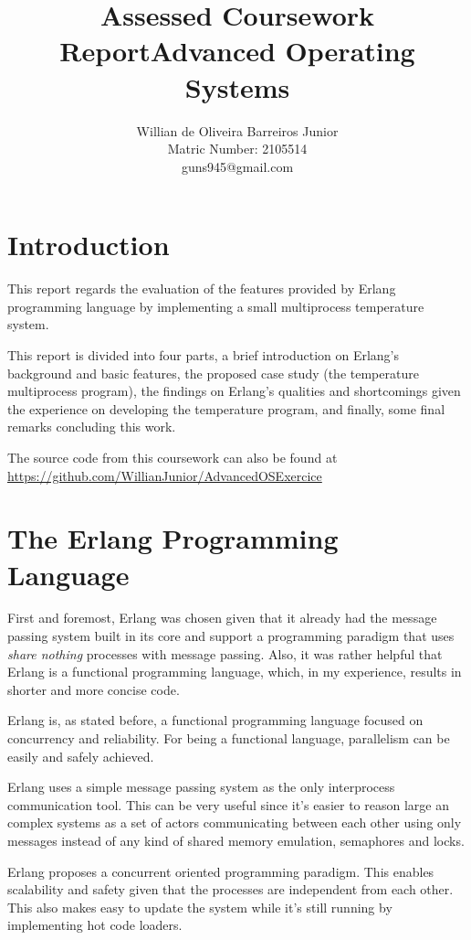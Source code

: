 \documentclass[twocolumn,10pt]{article}
\title{Assessed Coursework Report\linebreak Advanced Operating Systems}
\author{Willian de Oliveira Barreiros Junior\\
Matric Number: 2105514\\
 guns945@gmail.com\\}
\begin{document}
\clearpage
\thispagestyle{empty}
\maketitle

\section*{Introduction}
This report regards the evaluation of the features provided by Erlang programming language by implementing a small multiprocess temperature system.

This report is divided into four parts, a brief introduction on Erlang's background and basic features, the proposed case  study (the temperature multiprocess program), the findings on Erlang's qualities and shortcomings given the experience on developing the temperature program, and finally, some final remarks concluding this work.

The source code from this coursework can also be found at
\url{https://github.com/WillianJunior/AdvancedOSExercice}

\section*{The Erlang Programming Language}
First and foremost, Erlang was chosen given that it already had the message passing system built in its core and support a programming paradigm that uses \textit{share nothing} processes with message passing. Also, it was rather helpful that Erlang is a functional programming language, which, in my experience, results in shorter and more concise code.

Erlang is, as stated before, a functional programming language focused on concurrency and reliability. For being a functional language, parallelism can be easily and safely achieved.

Erlang uses a simple message passing system as the only interprocess communication tool. This can be very useful since it's easier to reason large an complex systems as a set of actors communicating between each other using only messages instead of any kind of shared memory emulation, semaphores and locks.

Erlang proposes a concurrent oriented programming paradigm. This enables scalability and safety given that the processes are independent from each other. This also makes easy to update the system while it's still running by implementing hot code loaders.
\end{document}
